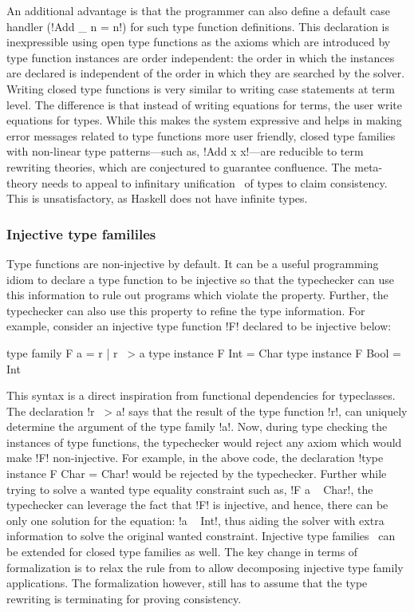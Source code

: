 \documentclass[screen,nonacm,manuscript,review]{acmart} %
\begin{document}
An additional advantage is that the programmer can also define a
default case handler (!Add _ n = n!) for such type function
definitions. This declaration is inexpressible using open type
functions as the axioms which are introduced by type function
instances are order independent: the order in which the instances
are declared is independent of the order in which they are searched by
the solver. Writing closed type functions is very similar to writing case
statements at term level. The difference is that instead of writing
equations for terms, the user write equations for types. While this
makes the system expressive and helps in making error messages related
to type functions more user friendly, closed type families with
non-linear type patterns---such as, !Add x x!---are reducible to
term rewriting theories\cite{mizuhito_rta_1995}, which are conjectured
to guarantee confluence. The meta-theory needs to appeal to infinitary
unification~\cite{jaffar_efficient_1984} of types to claim
consistency. This is unsatisfactory, as Haskell does not have
infinite types.

\subsubsection{Injective type famililes}
Type functions are non-injective by default. It can be a useful
programming idiom to declare a type function to be injective so that
the typechecker can use this information to rule out programs which
violate the property. Further, the typechecker can also use this
property to refine the type information. For example, consider an
injective type function !F! declared to be injective below:

\begin{CenteredBox}
\begin{code}
type family F a = r | r ~> a
type instance F Int = Char
type instance F Bool = Int
\end{code}
\end{CenteredBox}
This syntax is a direct inspiration from functional dependencies for
typeclasses. The declaration !r ~> a! says that the result of the type
function !r!, can uniquely determine the argument of the type family
!a!. Now, during type checking the instances of type functions, the
typechecker would reject any axiom which would make !F!
non-injective. For example, in the above code, the declaration
!type instance F Char = Char! would be rejected by the typechecker. Further
while trying to solve a wanted type equality constraint such as,
!F a ~ Char!, the typechecker can leverage the fact that !F! is injective,
and hence, there can be only one solution for the equation: !a ~ Int!,
thus aiding the solver with extra information to solve the original
wanted constraint. Injective type families~\cite{stolarek_injective_2015}
can be extended for closed type families as well.
The key change in terms of formalization is to relax the rule 
from  to allow decomposing injective type family applications.
The formalization however, still has to assume that
the type rewriting is terminating for proving consistency.
\end{document}
